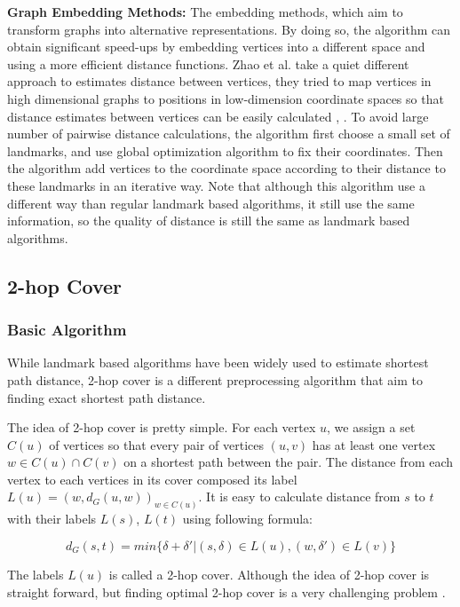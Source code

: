 \textbf{Graph Embedding Methods:} The embedding methods, which aim to transform graphs into alternative representations. By doing so, the algorithm can obtain significant speed-ups by embedding vertices into a different space and using a more efficient distance functions. Zhao et al. take a quiet different approach to estimates distance between vertices, they tried to map vertices in high dimensional graphs to positions in low-dimension coordinate spaces so that distance estimates between vertices can be easily calculated \cite{Zhao:2010:OSP:1863190.1863199}, \cite{DBLP:conf/colcom/ZhaoSZZ11}. To avoid large number of pairwise distance calculations, the algorithm first choose a small set of landmarks, and use global optimization algorithm to fix their coordinates. Then the algorithm add vertices to the coordinate space according to their distance to these landmarks in an iterative way. Note that although this algorithm use a different way than regular landmark based algorithms, it still use the same information, so the quality of distance is still the same as landmark based algorithms.

\subsection{2-hop Cover}

\subsubsection{Basic Algorithm}

While landmark based algorithms have been widely used to estimate shortest path distance, 2-hop cover is a different preprocessing algorithm that aim to finding exact shortest path distance. 

The idea of 2-hop cover is pretty simple. For each vertex $u$, we assign a set $C(u)$ of vertices so that every pair of vertices $(u,v)$ has at least one vertex $w \in C(u) \cap C(v)$ on a shortest path between the pair. The distance from each vertex to each vertices in its cover composed its label $L(u) = {(w, d_G(u,w))}_{w \in C(u)}$. It is easy to calculate distance from $s$ to $t$ with their labels $L(s)$, $L(t)$ using following formula:

\[
    d_G(s,t) = min\{\delta + \delta' | (s,\delta) \in L(u), (w,\delta') \in L(v)\}
\]

The labels ${L(u)}$ is called a 2-hop cover. Although the idea of 2-hop cover is straight forward, but finding optimal 2-hop cover is a very challenging problem \cite{Cohen:2002:RDQ:545381.545503}.

